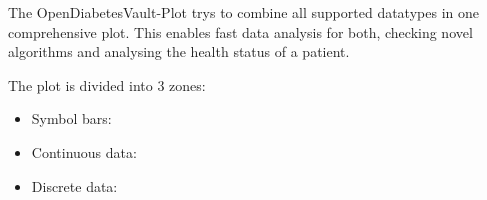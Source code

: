 \begin{changemargin}{4em}{4em} 

The OpenDiabetesVault-Plot trys to combine all supported datatypes in one comprehensive plot.
This enables fast data analysis for both, checking novel algorithms and analysing the health status of a patient.

The plot is divided into 3 zones:
\begin{itemize}
 \item Symbol bars:
 \item Continuous data:
 \item Discrete data:
\end{itemize}

\end{changemargin}
